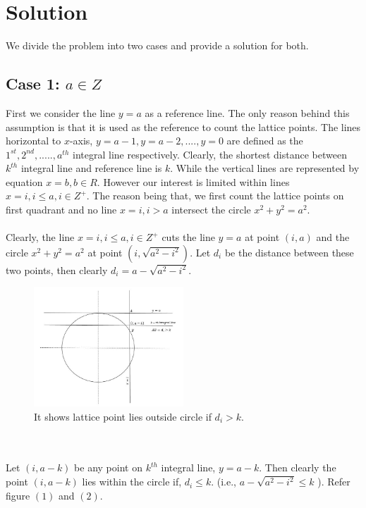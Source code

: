 \documentclass[journal,twoside]{IEEEtran}
\begin{document}
\section{Solution}
We divide the problem into two cases and provide a solution for both.
\subsection{Case 1: $a \in Z$}
First we consider the line $y=a$ as a reference line. The only reason behind this assumption is that it is used as the reference to count the lattice points. The lines horizontal to $x$-axis, $y=a-1, y=a-2,....,y=0$ are defined as the $1^{st}, 2^{nd},....., a^{th}$ integral line respectively. Clearly, the shortest distance between $k^{th}$ integral line and reference line is $k.$ While the vertical lines are represented by equation $x=b, b \in R$. However our interest is limited within lines $x=i,i \leq a,i \in Z^{+}$. The reason being that, we first count the lattice points on first quadrant and no line $x=i,i > a$ intersect the circle $x^{2}+y^{2}=a^{2}$.
\\\\ Clearly, the line $x=i, i \leq a, i \in Z^{+}$ cuts the line $y=a$ at point $(i,a)$ and the circle $x^{2}+y^{2}=a^{2}$ at point $(i, \sqrt{a^{2}-i^{2}})$. Let $d_{i}$ be the distance between these two points, then clearly $d_{i} = a- \sqrt{a^{2}-i^{2}}$.
\begin{figure}[h]
\caption{It shows lattice point lies outside circle if $d_{i}>k$.}
\centering
\includegraphics[width=0.5\textwidth]{diag2}
\end{figure}
\\\\ Let $(i,a-k)$ be any point on $k^{th}$ integral line, $y=a-k$. Then clearly the point $(i, a-k)$ lies within the circle if, $d_{i} \leq k$. (i.e., $a- \sqrt{a^{2}-i^{2}} \leq k$ ). Refer figure $(1)$ and $(2)$.
\end{document}
